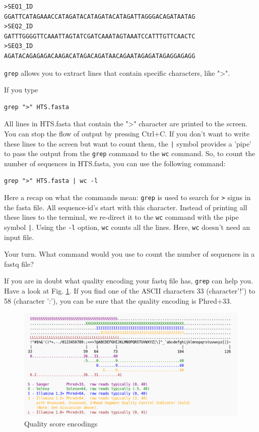\documentclass[11pt]{article}
\begin{document}
\begin{verbatim}
>SEQ1_ID
GGATTCATAGAAACCATAGATACATAGATACATAGATTAGGGACAGATAATAG
>SEQ2_ID
GATTTGGGGTTCAAATTAGTATCGATCAAATAGTAAATCCATTTGTTCAACTC
>SEQ3_ID
AGATACAGAGAGACAAGACATAGACAGATAACAGAATAGAGATAGAGGAGAGG
\end{verbatim}

\texttt{grep} allows you to extract lines that contain specific
characters, like ">". 


If you type

\begin{verbatim}
grep ">" HTS.fasta
\end{verbatim}

All lines in HTS.fasta that contain the ">" character are printed to
the screen. You can stop the flow of output by pressing Ctrl+C. If you
don't want to write these lines to the screen but want to count them,
the \texttt{|} symbol provides a 'pipe' to pass the output from the \texttt{grep}
command to the \texttt{wc} command. So, to count the number of
sequences in HTS.fasta, you can use the following command:

\begin{verbatim}
grep ">" HTS.fasta | wc -l
\end{verbatim}

Here a recap on what the commands mean: \texttt{grep} is used to search for
\texttt{>} signs in the fasta file. All sequence-id's start with this
character. Instead of printing all these lines to the terminal, we
re-direct it to the \texttt{wc} command with the pipe symbol \texttt{|}. Using the
\texttt{-l} option, \texttt{wc} counts all the lines. Here, \texttt{wc} doesn't need an
input file.


Your turn. What command would you use to count the number of sequences
in a fastq file? 


If you are in doubt what quality encoding your fastq file has, \texttt{grep}
can help you. Have a look at Fig. \ref{Fig:QC}. If you find one of the ASCII
characters 33 (character'!') to 58 (character ':'), you can be sure
that the quality encoding is Phred+33. 


\begin{figure}[htb]
\centering
\includegraphics[width=14cm]{Fastq.png}
\caption{\label{Fig:QC}Quality score encodings}
\end{figure}
\end{document}
